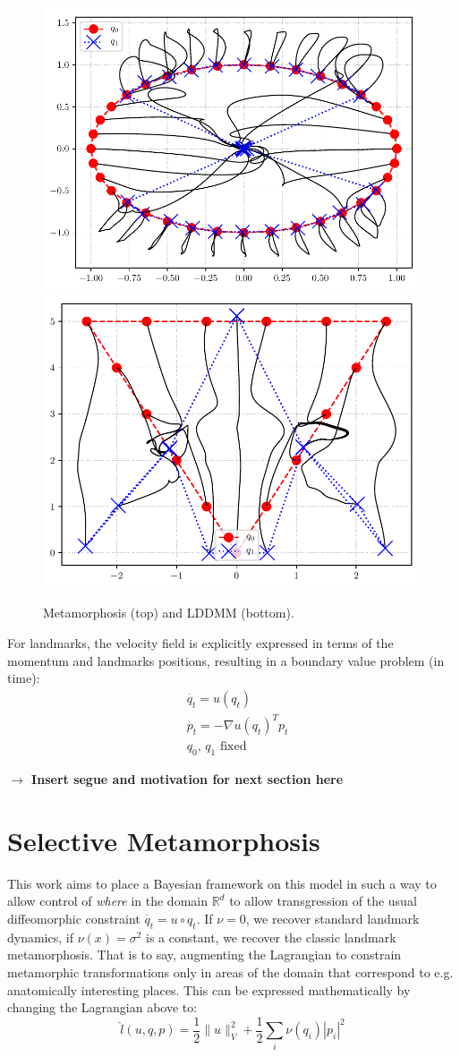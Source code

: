 \documentclass[runningheads]{llncs}
\newcommand{\half}{\frac 12}
\newcommand{\norm}[2]{\| #1 \|_{ #2 }}
\newcommand{\vnorm}[1]{\norm{ #1 }{V}}
\newcommand{\Rd}{\mathbb{R}^{d}}
\begin{document}
\begin{figure}
\begin{minipage}{\textwidth}
    \includegraphics[width=.3\textwidth]{lddmm_squeeze.pdf}\quad
    \includegraphics[width=.3\textwidth]{lddmm_triangle_flip.pdf}
    \caption{Metamorphosis (top) and LDDMM (bottom).}
    \label{fig:mm_lddmm}
\end{minipage}
\end{figure}

For landmarks, the velocity field is explicitly expressed in terms of the
momentum and landmarks positions, resulting in a boundary value problem (in
time):
\begin{align}
& \dot{q_t} = u(q_t)\\
& \dot{p_t} = - \nabla u(q_t)^T p_t\\
& q_0,\,q_1\text{ fixed}
\end{align}

\textbf{$\longrightarrow$ Insert segue and motivation for next section here}

\section{Selective Metamorphosis}\label{sec:select_mm}

This work aims to place a Bayesian framework on this model in such a way to
allow control of \emph{where} in the domain $\Rd$ to allow transgression of the
usual diffeomorphic constraint $\dot{q_t} = u\circ q_t$. If $\nu=0$, we recover
standard landmark dynamics, if $\nu(x)=\sigma^2$ is a constant, we recover the
classic landmark metamorphosis. That is to say, augmenting the Lagrangian to
constrain metamorphic transformations only in areas of the domain that
correspond to e.g. anatomically interesting places.  This can be expressed
mathematically by changing the Lagrangian above to:
\[
\hat l(u, q, p) = \half\vnorm{u}^2 + \half\sum_i \nu(q_i)|p_i|^2
\]
\end{document}
